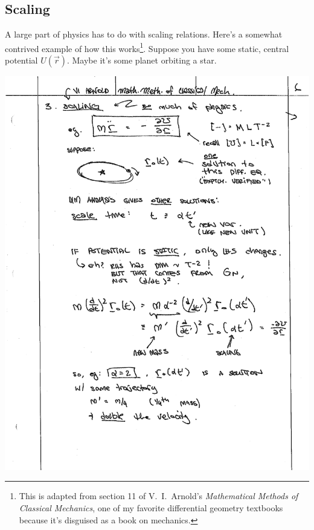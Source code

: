 \subsection{Scaling}

A large part of physics has to do with scaling relations. Here’s a somewhat contrived example of how this works\footnote{This is adapted from section 11 of V.\ I.\ Arnold's \emph{Mathematical Methods of Classical Mechanics}, one of my favorite differential geometry textbooks because it's disguised as a book on mechanics.}. Suppose you have some static, central potential $U(\vec r)$. Maybe it’s some planet orbiting a star. 

\begin{center}
\includegraphics[width=.7\textwidth]{figures/lec01_orbit.pdf}
\end{center}

